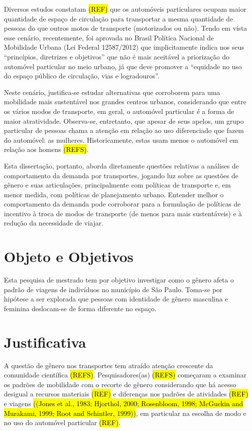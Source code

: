 Diversos estudos constatam \hl{(REF)} que os automóveis particulares ocupam maior quantidade de espaço de circulação para transportar a mesma quantidade de pessoas do que outros motos de transporte (motorizados ou não).  
Tendo em vista esse cenário, recentemente, foi aprovada no Brasil  Política Nacional de Mobilidade Urbana (Lei Federal 12587/2012) que implicitamente indica nos seus ``princípios, diretrizes e objetivos'' que não é mais aceitável a priorização do automóvel particular no meio urbano, já que deve promover a ``equidade no uso do espaço público de circulação, vias e logradouros''.

Neste cenário, justifica-se estudar alternativas que corroborem para uma mobilidade mais sustentável nos grandes centros urbanos, considerando que entre os vários modos de transporte, em geral, o automóvel particular é a forma de maior atratividade. Observa-se, entretanto, que apesar de seus apelos, um grupo particular de pessoas chama a atenção em relação ao uso diferenciado que fazem do automóvel: as mulheres.
Historicamente, estas usam menos o automóvel em relação aos homens \hl{(REFS)}.

Esta dissertação, portanto, aborda diretamente questões relativas a análises de comportamento da demanda por transportes, jogando luz sobre as questões de  gênero e suas articulações, principalmente com políticas de transporte e, em menor medida, com políticas de planejamento urbano. Entender melhor o comportamento da demanda pode corroborar para a formulação de políticas de incentivo à troca de modos de transporte (de menos para mais sustentáveis) e à redução da necessidade de viajar.

\section{Objeto e Objetivos}

Esta pesquisa de mestrado tem por objetivo investigar como o gênero afeta o padrão de viagens de indivíduos no município de São Paulo. Toma-se por hipótese a ser explorada que pessoas com identidade de gênero masculina e feminina deslocam-se de forma diferente no espaço.

\section{Justificativa}

A questão de gênero nos transportes tem atraído atenção crescente da comunidade científica \hl{(REFS)}.
Pesquisadores(as) \hl{(REFS)} começaram a examinar os padrões de mobilidade com o recorte de gênero considerando que há acesso desigual a recursos materiais \hl{(REF)} e diferenças nos padrões de atividades \hl{(REF)} e viagens \hl{((Jones et al., 1983; Hjorthol, 2000; Rosenbloom, 1998; McGuckin and Murakami, 1999; Root and Schintler, 1999))}, em particular na escolha de modo e no uso do automóvel particular \hl{(REF)}.

